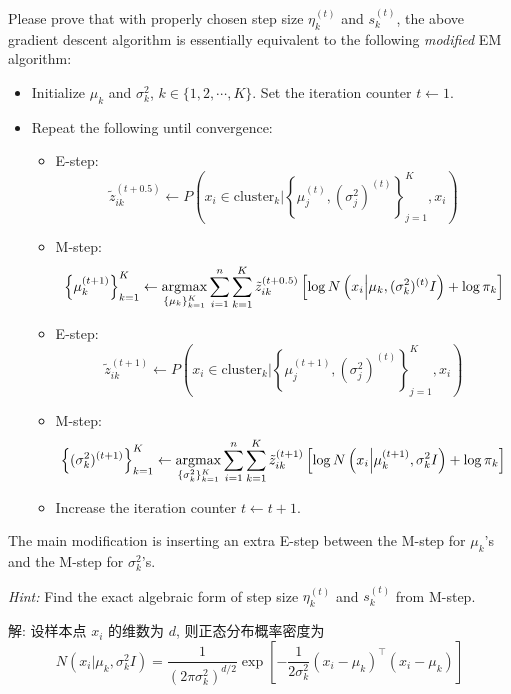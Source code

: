 \documentclass{article}
\begin{document}
Please prove that with properly chosen step size $\eta_k^{(t)}$ and $s_k^{(t)}$, the above gradient descent algorithm is essentially equivalent to the following \emph{modified} EM algorithm:
\begin{itemize}
	\item Initialize $\mu_k$ and $\sigma_k^2$, $k \in \{1,2,\cdots ,K\}$. Set the iteration counter $t\leftarrow1$.
	\item Repeat the following until convergence:
	\begin{itemize}
		\item E-step:
      \begin{equation}
        \tilde{z}_{ik}^{(t+0.5)} \leftarrow P\left(x_i\in \mathrm{cluster}_k \Big| \left\{\mu_j^{(t)},(\sigma_j^2)^{(t)}\right\}_{j=1}^K,x_i\right)
      \end{equation}
		\item M-step:
      \begin{equation}
        \left\{\mu_k^{(t+1)}\right\}_{k=1}^K \leftarrow \operatorname*{argmax}_{\{\mu_k\}_{k=1}^K} \sum_{i=1}^n\sum_{k=1}^K \tilde{z}_{ik}^{(t+0.5)} \left[\log N\left(x_i\Big|\mu_k,(\sigma_k^2)^{(t)}I\right)+\log\pi_k\right]
      \end{equation}
		\item E-step:
      \begin{equation}
        \tilde{z}_{ik}^{(t+1)} \leftarrow P\left(x_i \in \mathrm{cluster}_k \Big| \left\{\mu_j^{(t+1)},(\sigma_j^2)^{(t)}\right\}_{j=1}^K,x_i\right)
      \end{equation}
		\item M-step:
      \begin{equation}
        \left\{(\sigma_k^2)^{(t+1)}\right\}_{k=1}^K \leftarrow \operatorname*{argmax}_{\{\sigma_k^2\}_{k=1}^K} \sum_{i=1}^n \sum_{k=1}^K \tilde{z}_{ik}^{(t+1)} \left[\log N\left(x_i\Big|\mu_k^{(t+1)},\sigma_k^2I\right)+\log \pi_k \right]
      \end{equation}
		\item Increase the iteration counter $t\leftarrow t+1$.
	\end{itemize}
\end{itemize}

The main modification is inserting an extra E-step between the M-step for $\mu_k$'s and the M-step for $\sigma_k^2$'s.

\emph{Hint:} Find the exact algebraic form of step size $\eta_k^{(t)}$ and $s_k^{(t)}$ from M-step.

解: 设样本点 $x_i$ 的维数为 $d$, 则正态分布概率密度为
\begin{equation}
  N(x_i|\mu_k,\sigma_k^2I)=\frac{1}{(2\pi\sigma_k^2)^{d/2}}\exp\left[-\frac{1}{2\sigma_k^2}(x_i-\mu_k)^{\top}(x_i-\mu_k)\right]
\end{equation}
\end{document}
